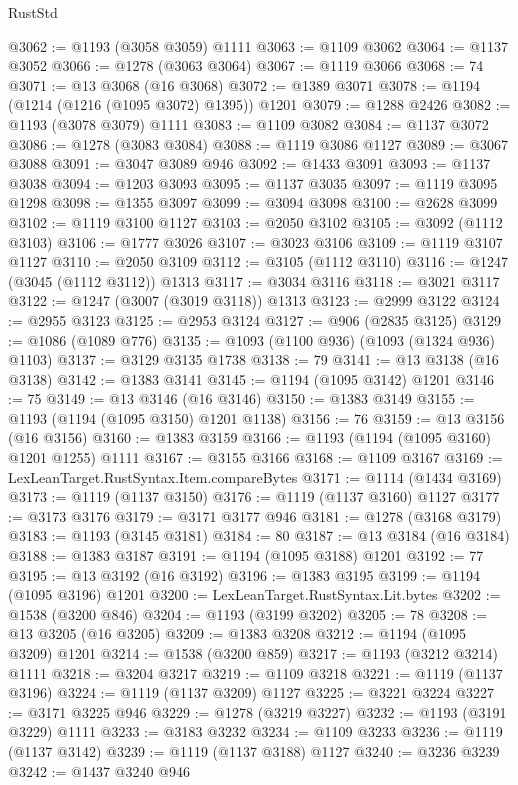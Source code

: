 \begin{lexlean}{RustStd}
\begin{coremodule}
{\begin{coremodule}
{{{{{{{{{{{{{{{{{{{{{{{{{{{{{{{@3062 := @1193 (@3058 @3059) @1111
@3063 := @1109 @3062
@3064 := @1137 @3052
@3066 := @1278 (@3063 @3064)
@3067 := @1119 @3066
@3068 := 74
@3071 := @13 @3068 (@16 @3068)
@3072 := @1389 @3071
@3078 := @1194 (@1214 (@1216 (@1095 @3072) @1395)) @1201
@3079 := @1288 @2426
@3082 := @1193 (@3078 @3079) @1111
@3083 := @1109 @3082
@3084 := @1137 @3072
@3086 := @1278 (@3083 @3084)
@3088 := @1119 @3086 @1127
@3089 := @3067 @3088
@3091 := @3047 @3089 @946
@3092 := @1433 @3091
@3093 := @1137 @3038
@3094 := @1203 @3093
@3095 := @1137 @3035
@3097 := @1119 @3095 @1298
@3098 := @1355 @3097
@3099 := @3094 @3098
@3100 := @2628 @3099
@3102 := @1119 @3100 @1127
@3103 := @2050 @3102
@3105 := @3092 (@1112 @3103)
@3106 := @1777 @3026
@3107 := @3023 @3106
@3109 := @1119 @3107 @1127
@3110 := @2050 @3109
@3112 := @3105 (@1112 @3110)
@3116 := @1247 (@3045 (@1112 @3112)) @1313
@3117 := @3034 @3116
@3118 := @3021 @3117
@3122 := @1247 (@3007 (@3019 @3118)) @1313
@3123 := @2999 @3122
@3124 := @2955 @3123
@3125 := @2953 @3124
@3127 := @906 (@2835 @3125)
@3129 := @1086 (@1089 @776)
@3135 := @1093 (@1100 @936) (@1093 (@1324 @936) @1103)
@3137 := @3129 @3135 @1738
@3138 := 79
@3141 := @13 @3138 (@16 @3138)
@3142 := @1383 @3141
@3145 := @1194 (@1095 @3142) @1201
@3146 := 75
@3149 := @13 @3146 (@16 @3146)
@3150 := @1383 @3149
@3155 := @1193 (@1194 (@1095 @3150) @1201 @1138)
@3156 := 76
@3159 := @13 @3156 (@16 @3156)
@3160 := @1383 @3159
@3166 := @1193 (@1194 (@1095 @3160) @1201 @1255) @1111
@3167 := @3155 @3166
@3168 := @1109 @3167
@3169 := LexLeanTarget.RustSyntax.Item.compareBytes
@3171 := @1114 (@1434 @3169)
@3173 := @1119 (@1137 @3150)
@3176 := @1119 (@1137 @3160) @1127
@3177 := @3173 @3176
@3179 := @3171 @3177 @946
@3181 := @1278 (@3168 @3179)
@3183 := @1193 (@3145 @3181)
@3184 := 80
@3187 := @13 @3184 (@16 @3184)
@3188 := @1383 @3187
@3191 := @1194 (@1095 @3188) @1201
@3192 := 77
@3195 := @13 @3192 (@16 @3192)
@3196 := @1383 @3195
@3199 := @1194 (@1095 @3196) @1201
@3200 := LexLeanTarget.RustSyntax.Lit.bytes
@3202 := @1538 (@3200 @846)
@3204 := @1193 (@3199 @3202)
@3205 := 78
@3208 := @13 @3205 (@16 @3205)
@3209 := @1383 @3208
@3212 := @1194 (@1095 @3209) @1201
@3214 := @1538 (@3200 @859)
@3217 := @1193 (@3212 @3214) @1111
@3218 := @3204 @3217
@3219 := @1109 @3218
@3221 := @1119 (@1137 @3196)
@3224 := @1119 (@1137 @3209) @1127
@3225 := @3221 @3224
@3227 := @3171 @3225 @946
@3229 := @1278 (@3219 @3227)
@3232 := @1193 (@3191 @3229) @1111
@3233 := @3183 @3232
@3234 := @1109 @3233
@3236 := @1119 (@1137 @3142)
@3239 := @1119 (@1137 @3188) @1127
@3240 := @3236 @3239
@3242 := @1437 @3240 @946
}}}}}}}}}}}}}}}}}}}}}}}}}}}}}}}
\end{coremodule}}
\end{coremodule}
\end{lexlean}

